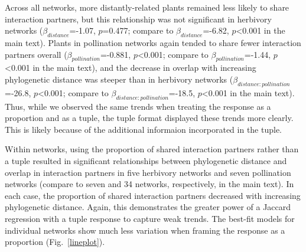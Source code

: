 \documentclass[12pt]{article}
\begin{document}
\begin{spacing}{1.5}
    Across all networks, more distantly-related plants remained less likely
    to share interaction partners, but this relationship was not significant 
    in herbivory networks ($\beta_{distance}$=-1.07, $p$=0.477; compare to 
    $\beta_{distance}$=-6.82, $p$\textless0.001 in the main text). Plants in pollination networks again tended to share fewer interaction partners overall ($\beta_{pollination}$=-0.881, $p$\textless0.001; compare to $
    \beta_{pollination}$=-1.44, $p$\textless0.001 in the main text), and the decrease in overlap with increasing phylogenetic distance was steeper than in herbivory networks ($\beta_{distance:pollination}$=-26.8, $p$\textless0.001; compare to $\beta_{distance:pollination}$=-18.5, $p$\textless0.001 in the main text). Thus, while we observed the same trends when treating the response as a proportion and as a tuple, the tuple format displayed these trends more clearly. This is likely because of the additional informaion incorporated in the tuple.


    Within networks, using the proportion of shared interaction partners rather than a tuple resulted in significant relationships between phylogenetic distance and overlap in interaction partners in five herbivory networks and seven pollination networks (compare to seven and 34 networks, respectively, in the main text). In each case, the proportion of shared interaction partners decreased with increasing phylogenetic distance. Again, this demonstrates the greater power of a Jaccard regression with a tuple response to capture weak trends. The best-fit models for individual networks show much less variation when framing the response as a proportion (Fig.~\ref{lineplot}).



\end{spacing}
\end{document}
